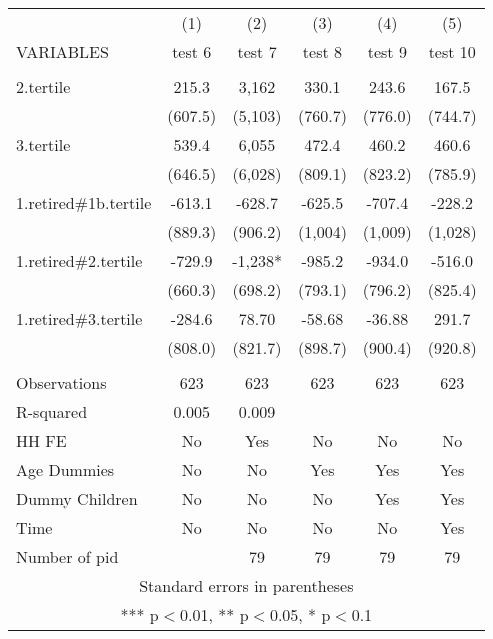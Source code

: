\begin{tabular}{lccccc} \hline
 & (1) & (2) & (3) & (4) & (5) \\
VARIABLES & test 6 & test 7 & test 8 & test 9 & test 10 \\ \hline
 &  &  &  &  &  \\
2.tertile & 215.3 & 3,162 & 330.1 & 243.6 & 167.5 \\
 & (607.5) & (5,103) & (760.7) & (776.0) & (744.7) \\
3.tertile & 539.4 & 6,055 & 472.4 & 460.2 & 460.6 \\
 & (646.5) & (6,028) & (809.1) & (823.2) & (785.9) \\
1.retired\#1b.tertile & -613.1 & -628.7 & -625.5 & -707.4 & -228.2 \\
 & (889.3) & (906.2) & (1,004) & (1,009) & (1,028) \\
1.retired\#2.tertile & -729.9 & -1,238* & -985.2 & -934.0 & -516.0 \\
 & (660.3) & (698.2) & (793.1) & (796.2) & (825.4) \\
1.retired\#3.tertile & -284.6 & 78.70 & -58.68 & -36.88 & 291.7 \\
 & (808.0) & (821.7) & (898.7) & (900.4) & (920.8) \\
 &  &  &  &  &  \\
Observations & 623 & 623 & 623 & 623 & 623 \\
R-squared & 0.005 & 0.009 &  &  &  \\
HH FE & No & Yes & No & No & No \\
Age Dummies & No & No & Yes & Yes & Yes \\
Dummy Children & No & No & No & Yes & Yes \\
Time & No & No & No & No & Yes \\
 Number of pid &  & 79 & 79 & 79 & 79 \\ \hline
\multicolumn{6}{c}{ Standard errors in parentheses} \\
\multicolumn{6}{c}{ *** p$<$0.01, ** p$<$0.05, * p$<$0.1} \\
\end{tabular}
